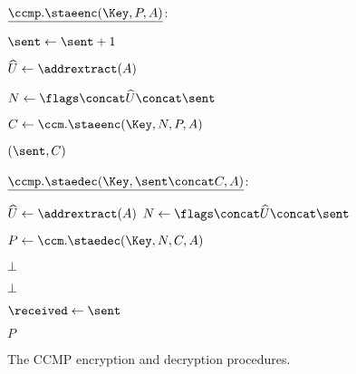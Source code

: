 \begin{figure}


\begin{adjustbox}{margin*=2ex,width=0.996\textwidth,frame,center}

	\begin{minipage}[t]{0.48\textwidth}
	
		$\underline{\ccmp.\staeenc(\Key, P, A)}$: 
		\begin{algorithmic}[1]
			
			\State $\sent \gets \sent + 1$
			
			\State $\widehat{U} \gets \addrextract(A)$
			
			\State $N \gets \flags \concat \widehat{U} \concat \sent $
			
			\State 
			
			\State $C \gets \ccm.\staeenc(\Key, N, P, A)$
			
			\State 
			\State \Return $(\sent, C)$
	
		\end{algorithmic}
	\end{minipage}
	
	\begin{minipage}[t]{0.42\textwidth}		
		$\underline{\ccmp.\staedec(\Key, \sent \concat C, A)}$: 
		\begin{algorithmic}[1]
			
			\State $\widehat{U} \gets \addrextract(A)$
			\State $N \gets \flags \concat \widehat{U} \concat \sent$
			
			\State
			\State $P \gets \ccm.\staedec(\Key, N, C, A)$ \label{alg:CCMP:line:CCM_decrypt}
			
			\State
			\If{$P = \bot$}
				\State \Return $\bot$
			\EndIf
			
			\State
			\If{$\sent \leq \received$} \label{alg:CCMP:line:check_replay}
				\State \Return $\bot$
			\EndIf
			
			\State
			\State $\received \gets \sent$
			
			\State 
			\State \Return $P$

		\end{algorithmic}

	\end{minipage}
\end{adjustbox}

\caption{The CCMP encryption and decryption procedures.}
\label{fig:CCMP}


\end{figure}


